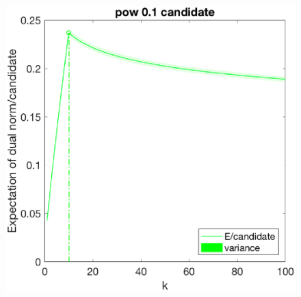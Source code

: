 \documentclass[12pt]{article}
\begin{document}
\begin{figure}[h]
\begin{minipage}[c]{.3\linewidth}
    \end{minipage}
    \hfill%
    \begin{minipage}[c]{.3\linewidth}
        \centering
        \includegraphics[width=\linewidth]{Fig/dualnorm-u0ones-k0-10-candidatepow.eps}
    \end{minipage}
\end{figure}
\end{document}
